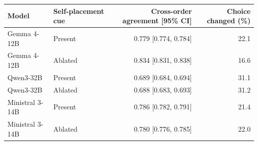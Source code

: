 \begin{tabular}{llrr}
\toprule
Model & Self-placement cue & Cross-order agreement [95\% CI] & Choice changed (\%) \\
\midrule
Gemma 4-12B & Present & 0.779 [0.774, 0.784] & 22.1 \\
Gemma 4-12B & Ablated & 0.834 [0.831, 0.838] & 16.6 \\
Qwen3-32B & Present & 0.689 [0.684, 0.694] & 31.1 \\
Qwen3-32B & Ablated & 0.688 [0.683, 0.693] & 31.2 \\
Ministral 3-14B & Present & 0.786 [0.782, 0.791] & 21.4 \\
Ministral 3-14B & Ablated & 0.780 [0.776, 0.785] & 22.0 \\
\bottomrule
\end{tabular}
